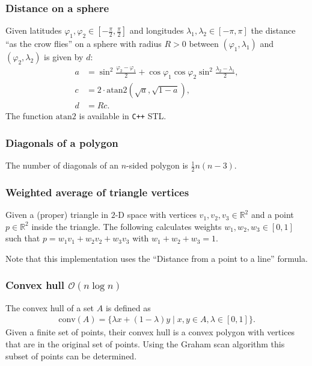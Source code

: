 \subsubsection{Distance on a sphere}
Given latitudes $\varphi_1, \varphi_2 \in [-\frac\pi2, \frac\pi2]$ and longitudes $\lambda_1, \lambda_2 \in [-\pi, \pi]$ the distance ``as the crow flies'' on a sphere with radius $R > 0$ between $(\varphi_1, \lambda_1)$ and $(\varphi_2, \lambda_2)$ is given by $d$:
\begin{align*}
    a &= \sin^2\frac{\varphi_2 - \varphi_1}2 + \cos\varphi_1 \cos\varphi_2 \sin^2\frac{\lambda_2 - \lambda_1}2, \\
    c &= 2\cdot\text{atan2}(\sqrt a, \sqrt{1 - a}), \\
    d &= Rc.
\end{align*}
The function $\text{atan2}$ is available in \texttt{C++} STL.

\subsubsection{Diagonals of a polygon}
The number of diagonals of an $n$-sided polygon is $\frac12n(n - 3)$.

\subsubsection{Weighted average of triangle vertices}
Given a (proper) triangle in $2$-D space with vertices $v_1, v_2, v_3 \in \mathbb R^2$ and a point $p \in \mathbb R^2$ inside the triangle. The following calculates weights $w_1, w_2, w_3 \in [0, 1]$ such that $p = w_1v_1 + w_2v_2 + w_3v_3$ with $w_1 + w_2 + w_3 = 1$.

Note that this implementation uses the ``Distance from a point to a line'' formula.

\subsubsection{Convex hull $\mathcal O(n \log n)$}
The convex hull of a set $A$ is defined as
\begin{align*}
    \text{conv}(A) = \{\lambda x + (1 - \lambda) y \mid x, y \in A, \lambda \in [0, 1]\}.
\end{align*}
Given a finite set of points, their convex hull is a convex polygon with vertices that are in the original set of points. Using the Graham scan algorithm this subset of points can be determined.



